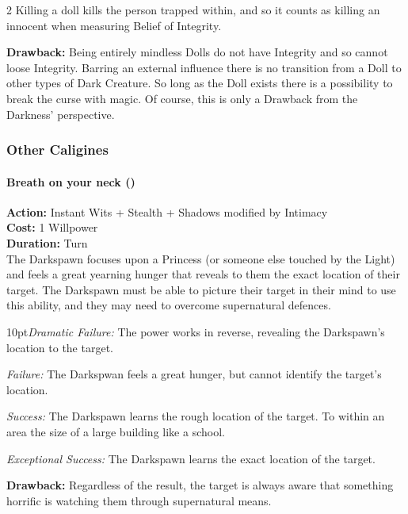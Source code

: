 \begin{multicols}{2}
Killing a doll kills the person trapped within, and so it counts as killing an innocent when measuring Belief of Integrity.

\textbf{Drawback:} Being entirely mindless Dolls do not have Integrity and so cannot loose Integrity. Barring an external influence there is no transition from a Doll to other types of Dark Creature. So long as the Doll exists there is a possibility to break the curse with magic. Of course, this is only a Drawback from the Darkness' perspective.

\subsubsection*{Other Caligines}

\paragraph*{Breath on your neck (\textbullet\textbullet)}

\noindent \textbf{Action:} Instant Wits + Stealth + Shadows modified by Intimacy\\

\noindent \textbf{Cost:} 1 Willpower \\

\noindent \textbf{Duration:} Turn \\

\noindent The Darkspawn focuses upon a Princess (or someone else touched by the Light) and feels a great yearning hunger that reveals to them the exact location of their target. The Darkspawn must be able to picture their target in their mind to use this ability, and they may need to overcome supernatural defences. 

    \begin{myindentpar}{10pt}\emph{Dramatic Failure:} The power works in reverse, revealing the Darkspawn's location to the target.
    
    \emph{Failure:} The Darkspwan feels a great hunger, but cannot identify the target's location. 
    
    \emph{Success:} The Darkspawn learns the rough location of the target. To within an area the size of a large building like a school.
    
    \emph{Exceptional Success:} The Darkspawn learns the exact location of the target. \\\end{myindentpar}
    
    \noindent \textbf{Drawback:} Regardless of the result, the target is always aware that something horrific is watching them through supernatural means. 


\end{multicols}
